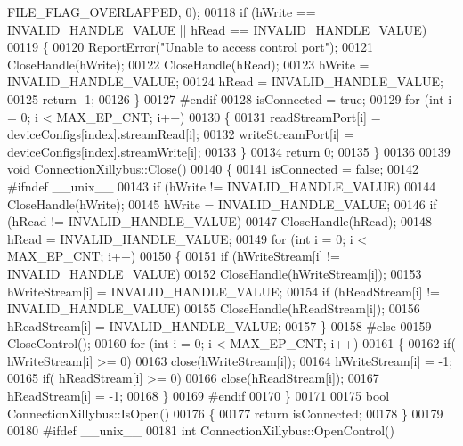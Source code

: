 \begin{DoxyCode}
      FILE\_FLAG\_OVERLAPPED, 0);
00118     \textcolor{keywordflow}{if} (hWrite == INVALID\_HANDLE\_VALUE || hRead == INVALID\_HANDLE\_VALUE)
00119     \{
00120         ReportError(\textcolor{stringliteral}{"Unable to access control port"});
00121         CloseHandle(hWrite);
00122         CloseHandle(hRead);
00123         hWrite = INVALID\_HANDLE\_VALUE;
00124         hRead = INVALID\_HANDLE\_VALUE;
00125         \textcolor{keywordflow}{return} -1;
00126     \}
00127 \textcolor{preprocessor}{#endif}
00128     isConnected = \textcolor{keyword}{true};
00129     \textcolor{keywordflow}{for} (\textcolor{keywordtype}{int} i = 0; i < MAX\_EP\_CNT; i++)
00130     \{
00131         readStreamPort[i] = deviceConfigs[index].streamRead[i];
00132         writeStreamPort[i] = deviceConfigs[index].streamWrite[i];
00133     \}
00134     \textcolor{keywordflow}{return} 0;
00135 \}
00136 
00139 \textcolor{keywordtype}{void} ConnectionXillybus::Close()
00140 \{
00141     isConnected = \textcolor{keyword}{false};
00142 \textcolor{preprocessor}{#ifndef \_\_unix\_\_}
00143     \textcolor{keywordflow}{if} (hWrite != INVALID\_HANDLE\_VALUE)
00144         CloseHandle(hWrite);
00145     hWrite = INVALID\_HANDLE\_VALUE;
00146     \textcolor{keywordflow}{if} (hRead != INVALID\_HANDLE\_VALUE)
00147         CloseHandle(hRead);
00148     hRead = INVALID\_HANDLE\_VALUE;
00149     \textcolor{keywordflow}{for} (\textcolor{keywordtype}{int} i = 0; i < MAX\_EP\_CNT; i++)
00150     \{
00151         \textcolor{keywordflow}{if} (hWriteStream[i] != INVALID\_HANDLE\_VALUE)
00152             CloseHandle(hWriteStream[i]);
00153         hWriteStream[i] = INVALID\_HANDLE\_VALUE;
00154         \textcolor{keywordflow}{if} (hReadStream[i] != INVALID\_HANDLE\_VALUE)
00155             CloseHandle(hReadStream[i]);
00156         hReadStream[i] = INVALID\_HANDLE\_VALUE;
00157     \}
00158 \textcolor{preprocessor}{#else}
00159     CloseControl();
00160     \textcolor{keywordflow}{for} (\textcolor{keywordtype}{int} i = 0; i < MAX\_EP\_CNT; i++)
00161     \{
00162         \textcolor{keywordflow}{if}( hWriteStream[i] >= 0)
00163             close(hWriteStream[i]);
00164         hWriteStream[i] = -1;
00165         \textcolor{keywordflow}{if}( hReadStream[i] >= 0)
00166             close(hReadStream[i]);
00167         hReadStream[i] = -1;
00168     \}
00169 \textcolor{preprocessor}{#endif}
00170 \}
00171 
00175 \textcolor{keywordtype}{bool} ConnectionXillybus::IsOpen()
00176 \{
00177     \textcolor{keywordflow}{return} isConnected;
00178 \}
00179 
00180 \textcolor{preprocessor}{#ifdef \_\_unix\_\_}
00181 \textcolor{keywordtype}{int} ConnectionXillybus::OpenControl()

\end{DoxyCode}
